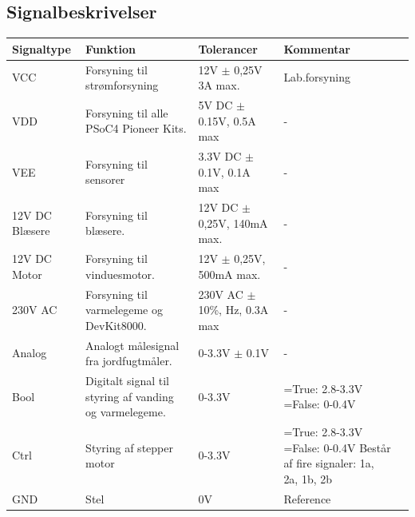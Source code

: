 \clearpage

\subsection{Signalbeskrivelser}
\label{subsec:signalbeskrivelser}


\begin{table}[h]
\begin{tabularx}{\textwidth}{| l | >{\raggedright}X | >{\raggedright}X | >{\raggedright\arraybackslash}X |>{\raggedright}X |}
\hline
	\textbf{Signaltype} & \textbf{Funktion} & \textbf{Tolerancer} & \textbf{Kommentar}\\ \hline
	VCC & Forsyning til strømforsyning & 12V $\pm$ 0,25V \newline 3A max. & Lab.forsyning  \\\hline	
	VDD & Forsyning til alle PSoC4 Pioneer Kits. & 5V DC $\pm$ 0.15V, \newline 0.5A max & - \\\hline
	VEE & Forsyning til sensorer & 3.3V DC $\pm$ 0.1V, \newline 0.1A max & - \\\hline
	12V DC Blæsere & Forsyning til blæsere. & 12V DC $\pm$ 0,25V, \newline 140mA max. & - \\\hline	
	12V DC Motor & Forsyning til vinduesmotor. & 12V $\pm$ 0,25V, \newline 500mA max. & - \\\hline
	230V AC & Forsyning til varmelegeme og DevKit8000. & 230V AC $\pm$ 10\%, \newline 50 Hz, \newline 0.3A max & - \\\hline
	Analog & Analogt målesignal fra jordfugtmåler. & 0-3.3V $\pm$ 0.1V & - \\\hline	
	Bool & Digitalt signal til styring af vanding og varmelegeme. & 0-3.3V & 1=True: 2.8-3.3V \newline 0=False: 0-0.4V \\\hline	
	Ctrl & Styring af stepper motor & 0-3.3V & 1=True: 2.8-3.3V \newline 0=False: 0-0.4V  \newline Består af fire signaler: \newline 1a, 2a, 1b, 2b \\\hline	
	GND & Stel & 0V & Reference \\\hline	

\end{tabularx}
\end{table}
